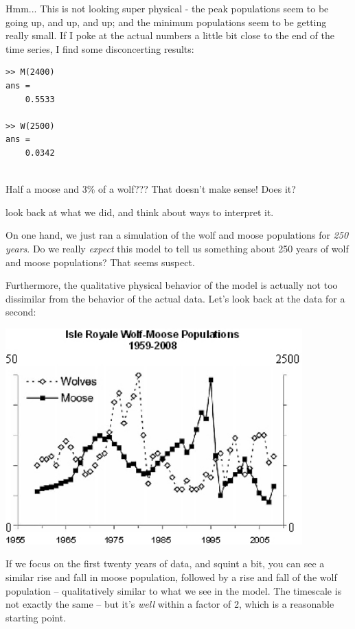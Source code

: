 Hmm... This is not looking super physical - the peak populations seem to be going up, and up, and up; and the minimum populations seem to be getting really small.  If I poke at the actual numbers a little bit close to the end of the time series, I find some disconcerting results:

\begin{verbatim}
>> M(2400)
ans =
    0.5533
    
>> W(2500)
ans =
    0.0342
    
\end{verbatim}
Half a moose and $3\%$ of a wolf???  That doesn't make sense!  Does it?
 
 look back at what we did, and think about ways to interpret it.  
 
 On one hand, we just ran a simulation of the wolf and moose populations for {\it 250 years}.  Do we really {\it expect} this model to tell us something  about 250 years of wolf and moose populations?  That seems suspect.

Furthermore, the qualitative physical behavior of the model is actually not too dissimilar from the behavior of the actual data.  Let's look back at the data for a second:

\beforefig
\includegraphics[width=4.5in]{figs/wolfmoosedata.jpg}


\afterfig

If we focus on the first twenty years of data, and squint a bit, you can see a similar rise and fall in moose population, followed by a rise and fall of the wolf population -- qualitatively similar to what we see in the model. The timescale is not exactly the same -- but it's {\it well} within a factor of 2, which is a reasonable starting point.

